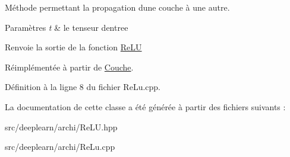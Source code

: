 Méthode permettant la propagation d\textquotesingle{}une couche à une autre. 


\begin{DoxyParams}{Paramètres}
{\em t} & le tenseur d\textquotesingle{}entree \\
\hline
\end{DoxyParams}
\begin{DoxyReturn}{Renvoie}
la sortie de la fonction \hyperlink{class_re_l_u}{Re\+LU} 
\end{DoxyReturn}


Réimplémentée à partir de \hyperlink{class_couche_a1f0ed59e21020f5d4f37933af4d1b1e5}{Couche}.



Définition à la ligne 8 du fichier Re\+Lu.\+cpp.



La documentation de cette classe a été générée à partir des fichiers suivants \+:\begin{DoxyCompactItemize}
\item 
src/deeplearn/archi/Re\+L\+U.\+hpp\item 
src/deeplearn/archi/Re\+Lu.\+cpp\end{DoxyCompactItemize}
